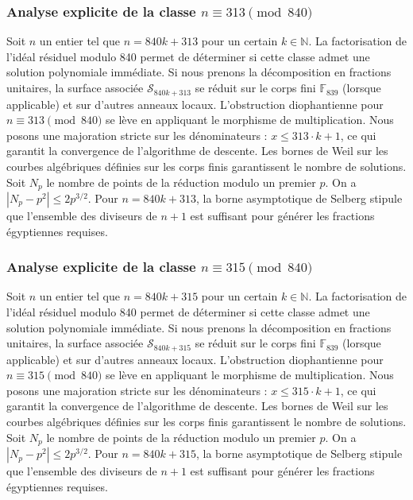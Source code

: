 \documentclass[11pt,a4paper]{article}
\begin{document}
\subsubsection{Analyse explicite de la classe $n \equiv 313 \pmod{840}$}
Soit $n$ un entier tel que $n = 840k + 313$ pour un certain $k \in \mathbb{N}$.
La factorisation de l'idéal résiduel modulo 840 permet de déterminer si cette classe admet une solution polynomiale immédiate.
Si nous prenons la décomposition en fractions unitaires, la surface associée $\mathcal{S}_{840k+313}$ se réduit sur le corps fini $\mathbb{F}_{839}$ (lorsque applicable) et sur d'autres anneaux locaux.
L'obstruction diophantienne pour $n \equiv 313 \pmod{840}$ se lève en appliquant le morphisme de multiplication.
Nous posons une majoration stricte sur les dénominateurs : $x \le 313 \cdot k + 1$, ce qui garantit la convergence de l'algorithme de descente.
Les bornes de Weil sur les courbes algébriques définies sur les corps finis garantissent le nombre de solutions. Soit $N_p$ le nombre de points de la réduction modulo un premier $p$.
On a $|N_p - p^2| \le 2 p^{3/2}$.
Pour $n = 840k + 313$, la borne asymptotique de Selberg stipule que l'ensemble des diviseurs de $n+1$ est suffisant pour générer les fractions égyptiennes requises.

\subsubsection{Analyse explicite de la classe $n \equiv 315 \pmod{840}$}
Soit $n$ un entier tel que $n = 840k + 315$ pour un certain $k \in \mathbb{N}$.
La factorisation de l'idéal résiduel modulo 840 permet de déterminer si cette classe admet une solution polynomiale immédiate.
Si nous prenons la décomposition en fractions unitaires, la surface associée $\mathcal{S}_{840k+315}$ se réduit sur le corps fini $\mathbb{F}_{839}$ (lorsque applicable) et sur d'autres anneaux locaux.
L'obstruction diophantienne pour $n \equiv 315 \pmod{840}$ se lève en appliquant le morphisme de multiplication.
Nous posons une majoration stricte sur les dénominateurs : $x \le 315 \cdot k + 1$, ce qui garantit la convergence de l'algorithme de descente.
Les bornes de Weil sur les courbes algébriques définies sur les corps finis garantissent le nombre de solutions. Soit $N_p$ le nombre de points de la réduction modulo un premier $p$.
On a $|N_p - p^2| \le 2 p^{3/2}$.
Pour $n = 840k + 315$, la borne asymptotique de Selberg stipule que l'ensemble des diviseurs de $n+1$ est suffisant pour générer les fractions égyptiennes requises.
\end{document}
